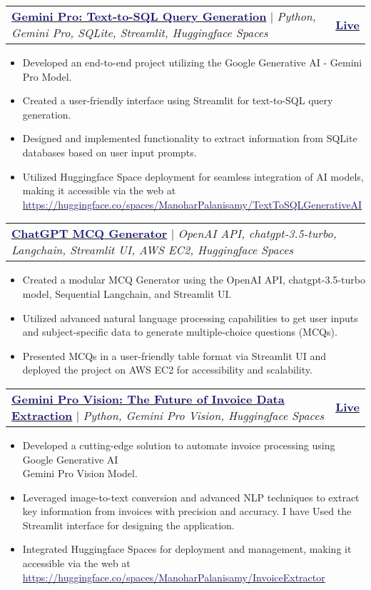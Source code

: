 \documentclass[letterpaper,11pt]{article}
\makeatletter
\newcommand{\resumeItem}[1]{
  \item\small{
    {#1 \vspace{-2pt}}
  }
}
\newcommand{\resumeProjectHeading}[2]{
    \item
    \begin{tabular*}{1.001\textwidth}{l@{\extracolsep{\fill}}r}
      \small#1 & \textbf{\small #2}\\
    \end{tabular*}\vspace{-7pt}
}
\newcommand{\resumeItemListStart}{\begin{itemize}}
\newcommand{\resumeItemListEnd}{\end{itemize}\vspace{-5pt}}
\makeatother
\begin{document}
    \resumeProjectHeading
    {\textbf{\href{https://huggingface.co/spaces/ManoharPalanisamy/TextToSQLGenerativeAI}{\textcolor{MidnightBlue}{Gemini Pro: Text-to-SQL Query Generation}}} $|$ \emph{Python, Gemini Pro, SQLite, Streamlit, Huggingface Spaces}} {\href{https://huggingface.co/spaces/ManoharPalanisamy/TextToSQLGenerativeAI}{\textcolor{MidnightBlue}{Live}}}
        \resumeItemListStart
          \resumeItem{Developed an end-to-end project utilizing the Google Generative AI - Gemini Pro Model.}
          \resumeItem{Created a user-friendly interface using Streamlit for text-to-SQL query generation.}
          \resumeItem{Designed and implemented functionality to extract information from SQLite databases based on user input prompts.}
          \resumeItem{Utilized Huggingface Space deployment for seamless integration of AI models, making it accessible via the web at {\href{https://huggingface.co/spaces/ManoharPalanisamy/TextToSQLGenerativeAI}{\textcolor{MidnightBlue}{https://huggingface.co/spaces/ManoharPalanisamy/TextToSQLGenerativeAI}}}}
         \resumeItemListEnd
         \vspace{-13pt}
    
         \resumeProjectHeading
         {\textbf{\href{https://github.com/send2manoo/ChatGPT-MCQ-Generator}{\textcolor{MidnightBlue}{ChatGPT MCQ Generator}}} $|$ \emph{OpenAI API, chatgpt-3.5-turbo, Langchain, Streamlit UI, AWS EC2, Huggingface Spaces}}{}
         \resumeItemListStart
             \resumeItem{Created a modular MCQ Generator using the OpenAI API, chatgpt-3.5-turbo model, Sequential Langchain, and Streamlit UI.}
             \resumeItem{Utilized advanced natural language processing capabilities to get user inputs and subject-specific data to generate multiple-choice questions (MCQs).}
             \resumeItem{Presented MCQs in a user-friendly table format via Streamlit UI and deployed the project on AWS EC2 for accessibility and scalability.}
         \resumeItemListEnd
         \vspace{-13pt}

         \resumeProjectHeading
        {\textbf{\href{https://huggingface.co/spaces/ManoharPalanisamy/InvoiceExtractor}{\textcolor{MidnightBlue}{Gemini Pro Vision: The Future of Invoice Data Extraction}}} $|$ \emph{Python, Gemini Pro Vision, Huggingface Spaces}} {\href{https://huggingface.co/spaces/ManoharPalanisamy/InvoiceExtractor}{\textcolor{MidnightBlue}{Live}}}
        \resumeItemListStart
          \resumeItem{Developed a cutting-edge solution to automate invoice processing using Google Generative AI \\ Gemini Pro Vision Model.}
          \resumeItem{Leveraged image-to-text conversion and advanced NLP techniques to extract key information from invoices with precision and accuracy. I have Used the Streamlit interface for designing the application.}
          \resumeItem{Integrated Huggingface Spaces for deployment and management, making it accessible via the web at {\href{https://huggingface.co/spaces/ManoharPalanisamy/InvoiceExtractor}{\textcolor{MidnightBlue}{https://huggingface.co/spaces/ManoharPalanisamy/InvoiceExtractor}}}}
         \resumeItemListEnd
\end{document}
